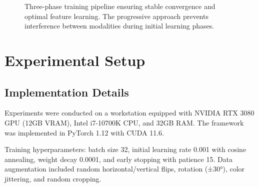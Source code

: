 \documentclass[conference]{IEEEtran}
\begin{document}
\begin{figure}[htbp]
\centering
{}
\caption{Three-phase training pipeline ensuring stable convergence and optimal feature learning. The progressive approach prevents interference between modalities during initial learning phases.}
\label{fig:training_pipeline}
\end{figure}

\section{Experimental Setup}

\subsection{Implementation Details}

Experiments were conducted on a workstation equipped with NVIDIA RTX 3080 GPU (12GB VRAM), Intel i7-10700K CPU, and 32GB RAM. The framework was implemented in PyTorch 1.12 with CUDA 11.6.

Training hyperparameters: batch size 32, initial learning rate 0.001 with cosine annealing, weight decay 0.0001, and early stopping with patience 15. Data augmentation included random horizontal/vertical flips, rotation (±30°), color jittering, and random cropping.
\end{document}

